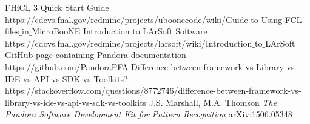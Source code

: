 \documentclass[9pt]{extreport}
\begin{document}
	\mainmatter
	
	
	
%	
%	



	\backmatter
%
%
	\printindex %

  	\begin{thebibliography}{1}

	 FHiCL 3 Quick Start Guide https://cdcvs.fnal.gov/redmine/projects/uboonecode/wiki/Guide${\_}$to${\_}$Using${\_}$FCL${\_}$files${\_}$in${\_}$MicroBooNE 
	 Introduction to LArSoft Software https://cdcvs.fnal.gov/redmine/projects/larsoft/wiki/Introduction${\_}$to${\_}$LArSoft
	 GitHub page containing Pandora documentation https://github.com/PandoraPFA
	 Difference between framework vs Library vs IDE vs API vs SDK vs Toolkits? https://stackoverflow.com/questions/8772746/difference-between-framework-vs-library-vs-ide-vs-api-vs-sdk-vs-toolkits
	 J.S. Marshall, M.A. Thomson {\em The Pandora Software Development Kit for Pattern Recognition} arXiv:1506.05348
  	\end{thebibliography}

	\appendix
	

  	
\end{document}
